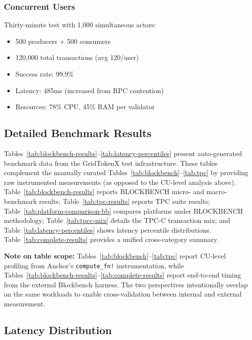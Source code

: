 \documentclass[conference]{IEEEtran}
\begin{document}
\subsubsection{Concurrent Users}
Thirty-minute test with 1,000 simultaneous actors:
\begin{itemize}
    \item 500 producers + 500 consumers
    \item 120,000 total transactions (avg 120/user)
    \item Success rate: 99.9\%
    \item Latency: 485ms (increased from RPC contention)
    \item Resources: 78\% CPU, 45\% RAM per validator
\end{itemize}

\subsection{Detailed Benchmark Results}

Tables~\ref{tab:blockbench-results}--\ref{tab:latency-percentiles} present auto-generated benchmark data from the GridTokenX test infrastructure. These tables complement the manually curated Tables~\ref{tab:blockbench}--\ref{tab:tpc} by providing raw instrumented measurements (as opposed to the CU-level analysis above). Table~\ref{tab:blockbench-results} reports BLOCKBENCH micro- and macro-benchmark results; Table~\ref{tab:tpc-results} reports TPC suite results; Table~\ref{tab:platform-comparison-bb} compares platforms under BLOCKBENCH methodology; Table~\ref{tab:tpcc-mix} details the TPC-C transaction mix; and Table~\ref{tab:latency-percentiles} shows latency percentile distributions. Table~\ref{tab:complete-results} provides a unified cross-category summary.

\textbf{Note on table scope:} Tables~\ref{tab:blockbench}--\ref{tab:tpc} report CU-level profiling from Anchor's \texttt{compute\_fn!} instrumentation, while Tables~\ref{tab:blockbench-results}--\ref{tab:complete-results} report end-to-end timing from the external Blockbench harness. The two perspectives intentionally overlap on the same workloads to enable cross-validation between internal and external measurement.




\subsection{Latency Distribution}
\end{document}
